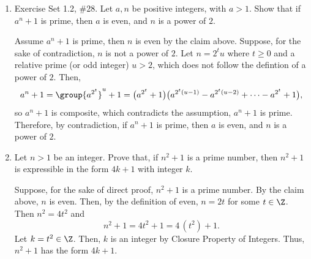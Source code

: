 \begin{enumerate}
  \begin{claim}
  Let $n > 1$ be an integer. If $n^{2}+1$ is prime then $n$ is even.
    \begin{subprove}
    Assume $n^{2}+1$ is prime. Suppose, for the sake of contradiction, $n$ is 
    odd. Then, $n=2k+1$ for some $k\in\setZ$. That is,
    \[
    n^{2}+1=(2k+1)^{2}+1=4k^{2}+4k+2=2\bigl(2k^{2}+2k+1\bigr).
    \]
    Thus, $n^{2}+1$ is even where $n^{2}+1 \ge 5$ by the assumption, not a prime. Therefore, by contradiction, If $n^{2}+1$ is prime then $n$ is even.
    \end{subprove}
  \end{claim}

  \item Exercise Set 1.2, \#28. Let $a,n$ be positive integers, with $a > 1$. Show that 
  if $a^{n}+1$ is prime, then $a$ is even, and $n$ is a power of $2$.
  \begin{subprove}
    Assume $a^{n}+1$ is prime, then $n$ is even by the claim above. Suppose, for 
    the sake of contradiction, $n$ is not a power of $2$. 
    Let $n=2^{t}u$ where $t\ge 0$ and a relative prime (or odd integer) $u>2$, 
    which does not follow the defintion of a power of $2$. Then,
    \[
    a^{n}+1 = \group{a^{2^{t}}}^u+1
    = \bigl(a^{2^{t}}+1\bigr)\bigl(a^{2^{t}(u-1)}-a^{2^{t}(u-2)}+\cdots - a^{2^{t}}+1\bigr),
    \]
    so $a^{n}+1$ is composite, which contradicts the assumption, $a^{n}+1$ is prime. 
    Therefore, by contradiction, if $a^{n}+1$ is prime, then $a$ is even, and $n$ is a power of $2$.
  \end{subprove}

  \item Let $n > 1$ be an integer. Prove that, if $n^{2} + 1$ is a prime number, then 
  $n^{2} + 1$ is expressible in the form $4k + 1$ with integer $k$.
  \begin{subprove}
    Suppose, for the sake of direct proof, $n^{2} + 1$ is a prime number. By the claim above, $n$ is even. 
    Then, by the definition of even, $n=2t$ for some $t\in\Z$. Then $n^{2}=4t^{2}$ and
    \[
      n^{2}+1 = 4t^{2}+1 = 4\,(t^{2}) + 1.
    \]
    Let $k=t^{2}\in\Z$. Then, $k$ is an integer by Closure Property of Integers. Thus, 
    $n^{2}+1$ has the form $4k+1$.
  \end{subprove}





  \newpage







\end{enumerate}
